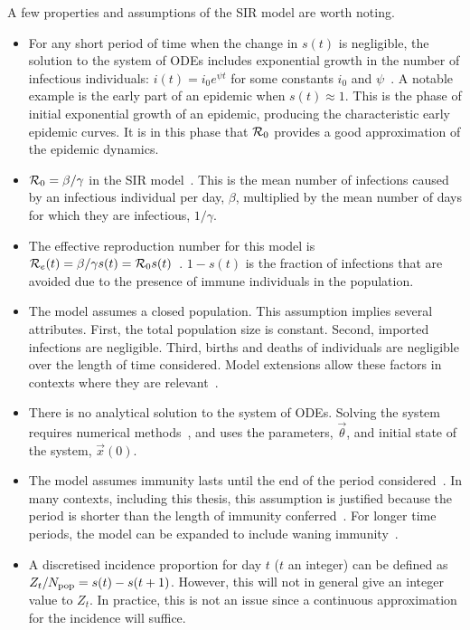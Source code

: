 \documentclass[thesis.tex]{subfiles}
\begin{document}
A few properties and assumptions of the SIR model are worth noting.
\begin{itemize}
    \item For any short period of time when the change in $s(t)$ is negligible, the solution to the system of ODEs includes exponential growth in the number of infectious individuals: $i(t) = i_0 e^{\psi t}$ for some constants $i_0$ and $\psi$~\autocite[section 1.2]{diekmannMathematical}.
    A notable example is the early part of an epidemic when $s(t) \approx 1$.
    This is the phase of initial exponential growth of an epidemic, producing the characteristic early epidemic curves.
    It is in this phase that $\mathcal{R}_{0}$ provides a good approximation of the epidemic dynamics.
    \item $\mathcal{R}_{0} = \beta / \gamma$ in the SIR model~\autocite[20]{keelingModeling}.
    This is the mean number of infections caused by an infectious individual per day, $\beta$, multiplied by the mean number of days for which they are infectious, $1/\gamma$.
    \item The effective reproduction number for this model is $\mathcal{R}_{e}(t) = \beta / \gamma s(t) = \mathcal{R}_{0} s(t)$~\autocite{pellisEstimation}.
    $1-s(t)$ is the fraction of infections that are avoided due to the presence of immune individuals in the population.
    \item The model assumes a closed population.
    This assumption implies several attributes.
    First, the total population size is constant.
    Second, imported infections are negligible. 
    Third, births and deaths of individuals are negligible over the length of time considered.
    Model extensions allow these factors in contexts where they are relevant~\autocites[26]{keelingModeling}[214]{kretzschmarMathematical}.
    \item There is no analytical solution to the system of ODEs.
      Solving the system requires numerical methods~\autocite[25]{keelingModeling}, and uses the parameters, $\vec{\theta}$, and initial state of the system, $\vec{x}(0)$.
    \item The model assumes immunity lasts until the end of the period considered~\autocite[61]{andersonInfectious}.
    In many contexts, including this thesis, this assumption is justified because the period is shorter than the length of immunity conferred~\autocite{milneImmunity}.
    For longer time periods, the model can be expanded to include waning immunity~\autocite[40]{keelingModeling}.
    \item A discretised incidence proportion for day $t$ ($t$ an integer) can be defined as $Z_t / N_\text{pop} = s(t) - s(t+1)$.
        However, this will not in general give an integer value to $Z_t$.
        In practice, this is not an issue since a continuous approximation for the incidence will suffice.
\end{itemize}
\end{document}
